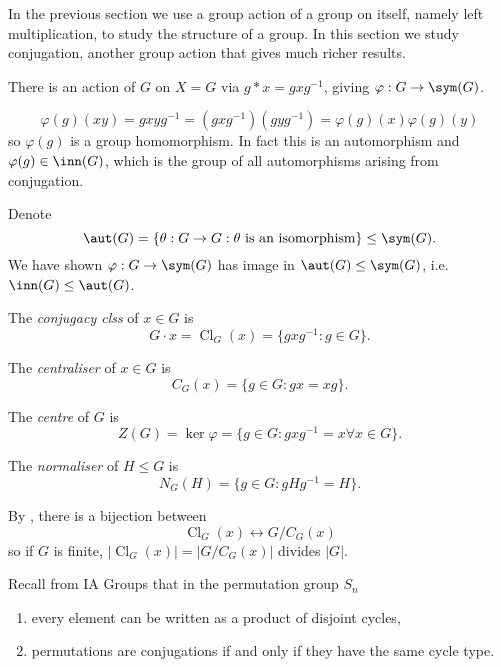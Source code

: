 \documentclass[a4paper]{article}
\theoremstyle{definition}
\DeclareMathOperator{\Cl}{Cl}
\begin{document}
In the previous section we use a group action of a group on itself, namely left multiplication, to study the structure of a group. In this section we study conjugation, another group action that gives much richer results.

There is an action of \(G\) on \(X = G\) via \(g * x = gxg^{-1}\), giving \(\varphi: G \to \sym(G)\).

\begin{remark}
  \[
    \varphi(g)(xy) = gxyg^{-1} = (gxg^{-1})(gyg^{-1}) = \varphi(g)(x) \varphi(g)(y)
  \]
  so \(\varphi(g)\) is a group homomorphism. In fact this is an automorphism and \(\varphi(g) \in \inn(G)\), which is the group of all automorphisms arising from conjugation.
\end{remark}

Denote
\[
  \aut(G) = \{\theta: G \to G: \theta \text{ is an isomorphism}\} \leq \sym(G).
\]
We have shown \(\varphi: G \to \sym(G)\) has image in \(\aut(G) \leq \sym(G)\), i.e.\ \(\inn(G) \leq \aut(G)\).

\begin{definition}
  The \emph{conjugacy clss} of \(x \in G\) is
  \[
    G \cdot x = \Cl_G(x) = \{gxg^{-1}: g \in G\}.
  \]
\end{definition}

\begin{definition}[Centraliser]
  The \emph{centraliser} of \(x \in G\) is
  \[
    C_G(x) = \{g \in G: gx = xg\}.
  \]
\end{definition}

\begin{definition}[Centre]
  The \emph{centre} of \(G\) is
  \[
    Z(G) = \ker \varphi = \{g \in G: gxg^{-1} = x \forall x \in G\}.
  \]
\end{definition}

\begin{definition}[Normaliser]
  The \emph{normaliser} of \(H \leq G\) is
  \[
    N_G(H) = \{g \in G: gHg^{-1} = H\}.
  \]
\end{definition}

By , there is a bijection between
\[
  \Cl_G(x) \leftrightarrow G/C_G(x)
\]
so if \(G\) is finite, \(|\Cl_G(x)| = |G/C_G(x)|\) divides \(|G|\).

Recall from IA Groups that in the permutation group \(S_n\)
\begin{enumerate}
\item every element can be written as a product of disjoint cycles,
\item permutations are conjugations if and only if they have the same cycle type.
\end{enumerate}
\end{document}
